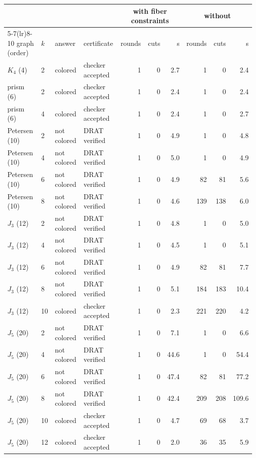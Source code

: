 \documentclass[11pt]{article}
\theoremstyle{definition}
\theoremstyle{remark}
\begin{document}
\begin{table}[tbp]\centering\footnotesize
\begin{tabular}{llllrrrrrr}
\toprule
 & & & & \multicolumn{3}{c}{with fiber constraints} & \multicolumn{3}{c}{without} \\
\cmidrule(lr){5-7}\cmidrule(lr){8-10}
graph (order) & $k$ & answer & certificate & rounds & cuts & s & rounds & cuts & s\\
\midrule
$K_4$ (4) & 2 & colored & checker accepted & 1 & 0 & 2.7 & 1 & 0 & 2.4 \\
\midrule
prism (6) & 2 & colored & checker accepted & 1 & 0 & 2.4 & 1 & 0 & 2.4 \\
prism (6) & 4 & colored & checker accepted & 1 & 0 & 2.4 & 1 & 0 & 2.7 \\
\midrule
Petersen (10) & 2 & not colored & DRAT verified & 1 & 0 & 4.9 & 1 & 0 & 4.8 \\
Petersen (10) & 4 & not colored & DRAT verified & 1 & 0 & 5.0 & 1 & 0 & 4.9 \\
Petersen (10) & 6 & not colored & DRAT verified & 1 & 0 & 4.9 & 82 & 81 & 5.6 \\
Petersen (10) & 8 & not colored & DRAT verified & 1 & 0 & 4.6 & 139 & 138 & 6.0 \\
\midrule
$J_3$ (12) & 2 & not colored & DRAT verified & 1 & 0 & 4.8 & 1 & 0 & 5.0 \\
$J_3$ (12) & 4 & not colored & DRAT verified & 1 & 0 & 4.5 & 1 & 0 & 5.1 \\
$J_3$ (12) & 6 & not colored & DRAT verified & 1 & 0 & 4.9 & 82 & 81 & 7.7 \\
$J_3$ (12) & 8 & not colored & DRAT verified & 1 & 0 & 5.1 & 184 & 183 & 10.4 \\
$J_3$ (12) & 10 & colored & checker accepted & 1 & 0 & 2.3 & 221 & 220 & 4.2 \\
\midrule
$J_5$ (20) & 2 & not colored & DRAT verified & 1 & 0 & 7.1 & 1 & 0 & 6.6 \\
$J_5$ (20) & 4 & not colored & DRAT verified & 1 & 0 & 44.6 & 1 & 0 & 54.4 \\
$J_5$ (20) & 6 & not colored & DRAT verified & 1 & 0 & 47.4 & 82 & 81 & 77.2 \\
$J_5$ (20) & 8 & not colored & DRAT verified & 1 & 0 & 42.4 & 209 & 208 & 109.6 \\
$J_5$ (20) & 10 & colored & checker accepted & 1 & 0 & 4.7 & 69 & 68 & 3.7 \\
$J_5$ (20) & 12 & colored & checker accepted & 1 & 0 & 2.0 & 36 & 35 & 5.9 \\

\end{tabular}
\end{table}
\end{document}
